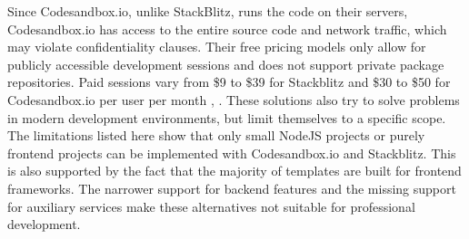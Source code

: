         Since Codesandbox.io, unlike StackBlitz, runs the code on their servers, Codesandbox.io has access to the entire source code and network traffic, which may violate confidentiality clauses. Their free pricing models only allow for publicly accessible development sessions and does not support private  package repositories. Paid sessions vary from \$9 to \$39 for Stackblitz and \$30 to \$50 for Codesandbox.io per user per month \cite{stackblitz}, \cite{codesandbox}. \newline
        These solutions also try to solve problems in modern development environments, but limit themselves to a specific scope. The limitations listed here show that only small NodeJS projects or purely frontend projects can be implemented with Codesandbox.io and Stackblitz. This is also supported by the fact that the majority of templates are built for frontend frameworks. The narrower support for backend features and the missing support for auxiliary services make these alternatives not suitable for professional development.

